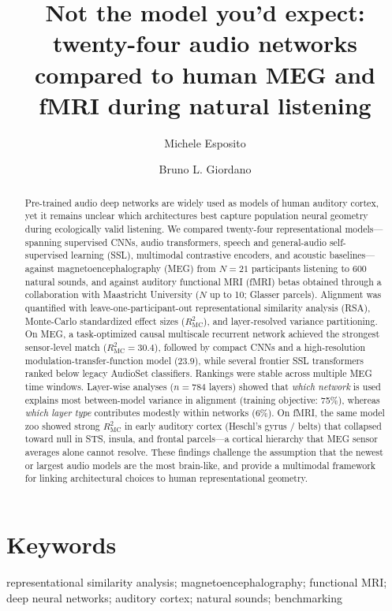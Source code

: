 \documentclass[11pt,a4paper]{article}
\title{\textbf{Not the model you'd expect:\\
twenty-four audio networks compared to human MEG and fMRI during natural listening}}
\author[1]{Michele Esposito}
\author[2]{Bruno L. Giordano}
\affil[1]{CNRS --- \textit{affiliation to be completed}}
\affil[2]{Aix-Marseille Université, CNRS, LIS --- \textit{affiliation to be completed}}
\date{}
\begin{document}
\maketitle

\begin{abstract}
Pre-trained audio deep networks are widely used as models of human auditory cortex, yet it remains unclear which architectures best capture population neural geometry during ecologically valid listening. We compared twenty-four representational models---spanning supervised CNNs, audio transformers, speech and general-audio self-supervised learning (SSL), multimodal contrastive encoders, and acoustic baselines---against magnetoencephalography (MEG) from $N=21$ participants listening to 600 natural sounds, and against auditory functional MRI (fMRI) betas obtained through a collaboration with Maastricht University ($N$ up to 10; Glasser parcels). Alignment was quantified with leave-one-participant-out representational similarity analysis (RSA), Monte-Carlo standardized effect sizes ($R^2_{\mathrm{MC}}$), and layer-resolved variance partitioning. On MEG, a task-optimized causal multiscale recurrent network achieved the strongest sensor-level match ($R^2_{\mathrm{MC}}=30.4$), followed by compact CNNs and a high-resolution modulation-transfer-function model ($23.9$), while several frontier SSL transformers ranked below legacy AudioSet classifiers. Rankings were stable across multiple MEG time windows. Layer-wise analyses ($n=784$ layers) showed that \emph{which network} is used explains most between-model variance in alignment (training objective: 75\%), whereas \emph{which layer type} contributes modestly within networks (6\%). On fMRI, the same model zoo showed strong $R^2_{\mathrm{MC}}$ in early auditory cortex (Heschl's gyrus / belts) that collapsed toward null in STS, insula, and frontal parcels---a cortical hierarchy that MEG sensor averages alone cannot resolve. These findings challenge the assumption that the newest or largest audio models are the most brain-like, and provide a multimodal framework for linking architectural choices to human representational geometry.
\end{abstract}

\section*{Keywords}
representational similarity analysis; magnetoencephalography; functional MRI; deep neural networks; auditory cortex; natural sounds; benchmarking
\end{document}
